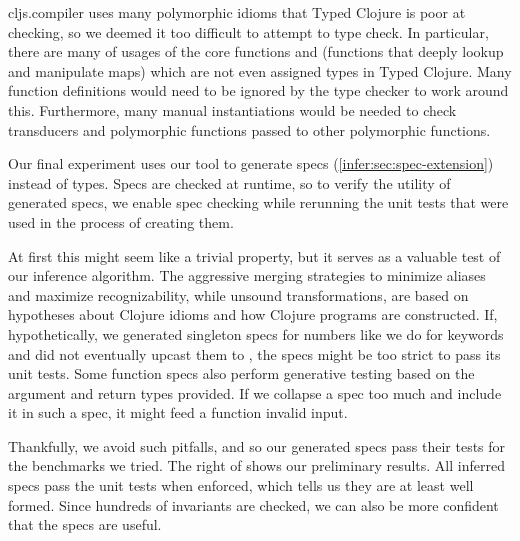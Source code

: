 cljs.compiler uses many polymorphic idioms that Typed Clojure is
poor at checking, so we deemed it too difficult to attempt to
type check. In particular, there are many of usages of the
core functions
 and  (functions that deeply lookup
and manipulate maps) which are not even assigned types
in Typed Clojure.
Many function definitions would need to be ignored by the type
checker to work around this.
Furthermore, many manual instantiations
would be needed to check transducers and polymorphic functions
passed to other polymorphic functions.




\label{infer:sec:experiment3}

Our final experiment uses our tool to
generate specs (\ref{infer:sec:spec-extension})
instead of types.
Specs are checked at runtime,
so to verify the utility of generated specs,
we enable spec checking while
rerunning the unit tests that were used
in the process of creating them.

At first this might seem like a trivial property, but it serves as
a valuable test of our inference algorithm.
The aggressive merging strategies to minimize aliases and
maximize recognizability, while unsound transformations,
are based on hypotheses about Clojure idioms and how
Clojure programs are constructed.
If, hypothetically, we generated singleton specs for numbers
like we do for keywords and did not eventually upcast
them to , the specs might be too strict
to pass its unit tests.
Some function specs also perform generative testing based on
the argument and return types provided.
If we collapse a spec too much and include it in such
a spec, it might feed a function invalid input.

Thankfully, we avoid such pitfalls, and so
our generated specs pass their tests for the benchmarks
we tried.
The right of  shows
our preliminary results. All inferred specs pass the unit
tests when enforced, which tells us they are at least well formed.
Since hundreds of invariants are checked, we can also be more confident
that the specs are useful.


